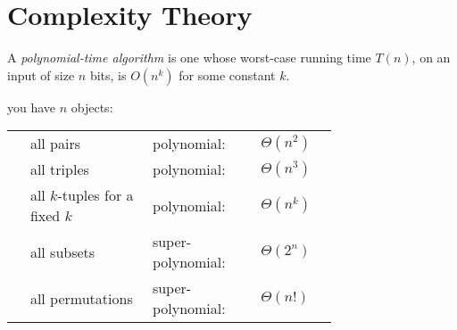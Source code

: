 


\section{Complexity Theory}










\begin{definition}
A \emph{polynomial-time algorithm} is one whose worst-case running time $T(n)$, on an input of size $n$ bits, is $O(n^{k})$ for some constant $k$.
\end{definition}


you have $n$ objects:\\[2pt]
\begin{tabular}{p{0.025\linewidth} p{0.3\linewidth} p{0.25\linewidth} p{0.15\linewidth}}
& all pairs                        & polynomial:        & $\Theta(n^2)$\\ 
& all triples                      & polynomial:        & $\Theta(n^3)$\\ 
& all $k$-tuples for a fixed $k$   & polynomial:        & $\Theta(n^k)$\\ 
& all subsets                      & super-polynomial: & $\Theta(2^n)$\\ 
& all permutations                 & super-polynomial: & $\Theta(n!)$\\ 
\end{tabular}

